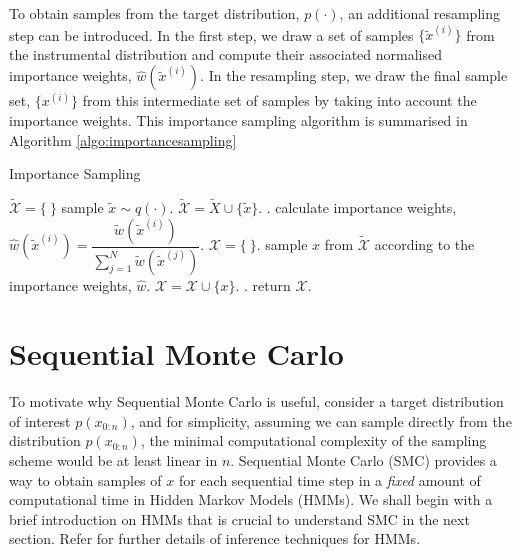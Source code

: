 To obtain samples from the target distribution, $p(\cdot)$, an additional resampling step can be introduced. In the first step, we draw a set of samples $\{\tilde{x}^{(i)}\}$ from the instrumental distribution and compute their associated normalised importance weights, $\hat{w}(\tilde{x}^{(i)})$. In the resampling step, we draw the final sample set, $\{x^{(i)}\}$ from this intermediate set of samples by taking into account the importance weights. This importance sampling algorithm is summarised in Algorithm \ref{algo:importancesampling}

\begin{algorithm}
\caption{Importance Sampling}\label{algo:importancesampling}
\begin{algorithmic}[1]
\State $\tilde{\mathcal{X}} = \{\ \}$
\Repeat
  \State sample $\tilde{x} \sim q(\cdot)$.
  \State $\tilde{\mathcal{X}} = \tilde{X} \cup \{\tilde{x}\}$.
.
\State calculate importance weights, $\hat{w}(\tilde{x}^{(i)})  = \dfrac{\tilde{w}(\tilde{x}^{(i)})}{\sum^N_{j=1} \tilde{w}(\tilde{x}^{(j)})}$.
\State $\mathcal{X} = \{\ \}$.
\Repeat
  \State sample $x$ from $\tilde{\mathcal{X}}$ according to the importance weights, $\hat{w}$.
  \State $\mathcal{X} = \mathcal{X} \cup \{x\}$.
.
\State return $\mathcal{X}$.
\EndFunction
\end{algorithmic}
\end{algorithm}

\section{Sequential Monte Carlo}
\label{sec:SMC}
To motivate why Sequential Monte Carlo is useful, consider a target distribution of interest $p(x_{0:n})$, and for simplicity, assuming we can sample directly from the distribution $p(x_{0:n})$, the minimal computational complexity of the sampling scheme would be at least linear in $n$. Sequential Monte Carlo (SMC) provides a way to obtain samples of $x$ for each sequential time step in a \emph{fixed} amount of computational time in Hidden Markov Models (HMMs). We shall begin with a brief introduction on HMMs that is crucial to understand SMC in the next section. Refer \cite{CO05} for further details of inference techniques for HMMs. 

